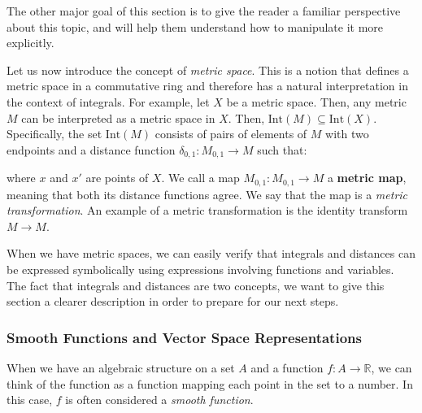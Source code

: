 \documentclass[a4paper,reqno,oneside]{article}
\begin{document}
The other major goal of this section is to give the reader a familiar perspective about this topic, and will help them understand how to manipulate it more explicitly.  

Let us now introduce the concept of \textit{metric space}. This is a notion that defines a metric space in a commutative ring and therefore has a natural interpretation in the context of integrals. For example, let $X$ be a metric space. Then, any metric $M$ can be interpreted as a metric space in $X$. Then, $\mathrm{Int}(M)\subseteq \mathrm{Int}(X)$. Specifically, the set $\mathrm{Int}(M)$ consists of pairs of elements of $M$ with two endpoints and a distance function $\delta_{0,1}: M_{0,1} \to M$ such that:
\begin{center}
\end{center}
where $x$ and $x'$ are points of $X$. We call a map $M_{0,1}: M_{0,1} \to M$ a \textbf{metric map}, meaning that both its distance functions agree. We say that the map is a \textit{metric transformation}. An example of a metric transformation is the identity transform $M \to M$.

When we have metric spaces, we can easily verify that integrals and distances can be expressed symbolically using expressions involving functions and variables. The fact that integrals and distances are two concepts, we want to give this section a clearer description in order to prepare for our next steps.

\subsubsection{Smooth Functions and Vector Space Representations} %
When we have an algebraic structure on a set $A$ and a function $f: A \to \mathbb{R}$, we can think of the function as a function mapping each point in the set to a number. In this case, $f$ is often considered a \textit{smooth function}.
\end{document}
